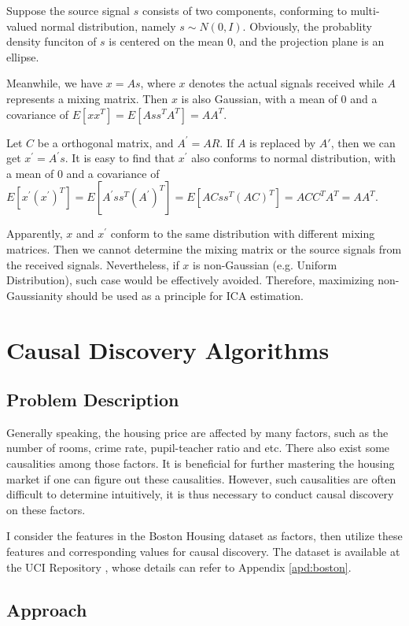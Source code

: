 \documentclass[12pt,a4paper]{article}
\theoremstyle{definition}
\begin{document}
Suppose the source signal $s$ consists of two components, conforming to multi-valued normal distribution, namely $s \sim N(0,I)$. Obviously, the probablity density funciton of $s$ is centered on the mean 0, and the projection plane is an ellipse.

Meanwhile, we have $x=As$, where $x$ denotes the actual signals received while $A$ represents a mixing matrix. Then $x$ is also Gaussian, with a mean of 0 and a covariance of $E[xx^{T}]=E[Ass^{T}A^{T}]=AA^{T}$.

Let $C$ be a orthogonal matrix, and $A^{'}=AR$. If $A$ is replaced by $A{'}$, then we can get $x^{'}=A^{'}s$. It is easy to find that $x^{'}$ also conforms to normal distribution, with a mean of 0 and a covariance of $E[x^{'}(x^{'})^{T}]=E[A^{'}ss^{T}(A^{'})^{T}]=E[ACss^{T}(AC)^{T}]=ACC^{T}A^{T}=AA^{T}$.

Apparently, $x$ and $x^{'}$ conform to the same distribution with different mixing matrices. Then we cannot determine the mixing matrix or the source signals from the received signals. Nevertheless, if $x$ is non-Gaussian (e.g. Uniform Distribution), such case would be effectively avoided. Therefore, maximizing non-Gaussianity should be used as a principle for ICA estimation.

\section{Causal Discovery Algorithms}

\subsection{Problem Description}

Generally speaking, the housing price are affected by many factors, such as the number of rooms, crime rate, pupil-teacher ratio and etc. There also exist some causalities among those factors. It is beneficial for further mastering the housing market if one can figure out these causalities. However, such causalities are often difficult to determine intuitively, it is thus necessary to conduct causal discovery on these factors.

I consider the features in the Boston Housing dataset as factors, then utilize these features and corresponding values for causal discovery. The dataset is available at the UCI Repository \cite{boston}, whose details can refer to Appendix \ref{apd:boston}.

\subsection{Approach}
\end{document}
